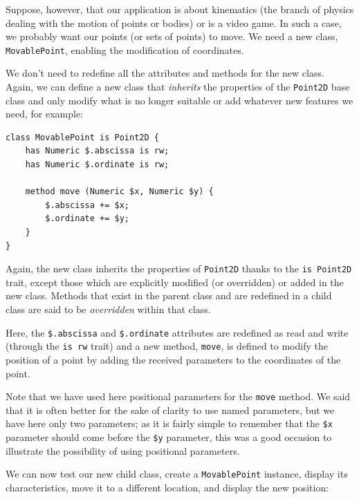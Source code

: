 Suppose, however, that our application is about kinematics 
(the branch of physics dealing with the motion of points or 
bodies) or is a video game. In such a case, we probably want 
our points (or sets of points) to move. We need a new class, 
{\tt MovablePoint}, enabling the modification of coordinates.

We don't need to redefine all the attributes and methods for 
the new class. Again, we can define a new class that 
\emph{inherits} the properties of the {\tt Point2D} base class 
and only modify what is no longer suitable or add whatever 
new features we need, for example:

\begin{verbatim}
class MovablePoint is Point2D {
    has Numeric $.abscissa is rw;
    has Numeric $.ordinate is rw;
    
    method move (Numeric $x, Numeric $y) {
        $.abscissa += $x;
        $.ordinate += $y;
    }
}
\end{verbatim}

Again, the new class inherits the properties of {\tt Point2D} thanks 
to the {\tt is Point2D} trait, except those which are explicitly 
modified (or overridden) or added in the new class. 
Methods that exist in the parent class and are 
redefined in a child class are said to be \emph{overridden} 
within that class. 

Here, the \verb'$.abscissa' and \verb'$.ordinate' attributes are 
redefined as read and write (through the {\tt is rw} trait) and 
a new method, {\tt move}, is defined to modify the position of 
a point by adding the received parameters to the coordinates 
of the point.

Note that we have used here positional parameters for the 
{\tt move} method. We said that it is often better for the sake of clarity 
to use named parameters, but we have here only two parameters; 
as it is fairly simple to remember that the \verb'$x' 
parameter should come before the \verb'$y' parameter, this 
was a good occasion to illustrate the possibility of using 
positional parameters.

We can now test our new child class, create a {\tt MovablePoint} 
instance, display its characteristics, move it to a different 
location, and display the new position:

